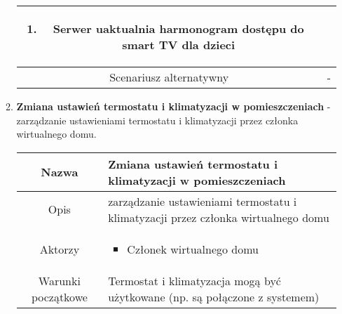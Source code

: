 \documentclass{article}
\begin{document}
\begin{enumerate}
\begin{enumerate}
\begin{table}[H]
\begin{tabular}{|c|p{7cm}|}
\begin{enumerate}
\item Serwer uaktualnia harmonogram dostępu do smart TV dla dzieci\end{enumerate} \\
						\hline
						Scenariusz alternatywny & -                                                                                                                                                                                                       \\
						\hline
					\end{tabular}
				\end{table}

			\item \textbf{Zmiana ustawień termostatu i klimatyzacji w pomieszczeniach}
				- zarządzanie ustawieniami termostatu i klimatyzacji przez członka
				wirtualnego domu.
				\begin{table}[H]
					\centering
					\begin{tabular}{|c|p{7cm}|}
						\hline
						Nazwa                   & \textbf{Zmiana ustawień termostatu i klimatyzacji w pomieszczeniach}                                                                                                                                                                                                                                                                                                                         \\
						\hline
						Opis                    & zarządzanie ustawieniami termostatu i klimatyzacji przez członka wirtualnego domu                                                                                                                                                                                                                                                                                                            \\
						\hline
						\hline
						Aktorzy                 & \begin{itemize}\item Członek wirtualnego domu\end{itemize}                                                                                                                                                                                                                                                                                                                                   \\
						\hline
						Warunki początkowe      & Termostat i klimatyzacja mogą być użytkowane (np. są połączone z systemem)                                                                                                                                                                                                                                                                                                                   \\

\end{tabular}
\end{table}
\end{enumerate}
\end{enumerate}
\end{document}
